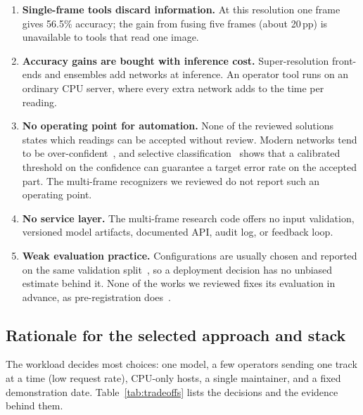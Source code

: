 \documentclass[11pt,a4paper]{article}
\newcommand{\pp}{\,pp}
\begin{document}
\begin{enumerate}[label=\textbf{G\arabic*}]
\item \textbf{Single-frame tools discard information.} At this resolution one frame gives 56.5\% accuracy; the gain from fusing five frames (about 20\pp) is unavailable to tools that read one image.
\item \textbf{Accuracy gains are bought with inference cost.} Super-resolution front-ends and ensembles add networks at inference. An operator tool runs on an ordinary CPU server, where every extra network adds to the time per reading.
\item \textbf{No operating point for automation.} None of the reviewed solutions states which readings can be accepted without review. Modern networks tend to be over-confident~\cite{guo2017calibration}, and selective classification~\cite{geifman2017selective} shows that a calibrated threshold on the confidence can guarantee a target error rate on the accepted part. The multi-frame recognizers we reviewed do not report such an operating point.
\item \textbf{No service layer.} The multi-frame research code offers no input validation, versioned model artifacts, documented API, audit log, or feedback loop.
\item \textbf{Weak evaluation practice.} Configurations are usually chosen and reported on the same validation split~\cite{recht2019imagenet}, so a deployment decision has no unbiased estimate behind it. None of the works we reviewed fixes its evaluation in advance, as pre-registration does~\cite{nosek2018preregistration}.
\end{enumerate}

\subsection{Rationale for the selected approach and stack}

The workload decides most choices: one model, a few operators sending one track at a time (low request rate), CPU-only hosts, a single maintainer, and a fixed demonstration date. Table~\ref{tab:tradeoffs} lists the decisions and the evidence behind them.
\end{document}
